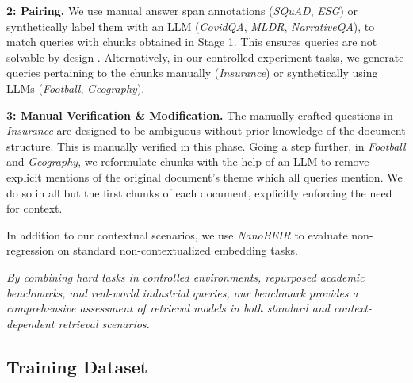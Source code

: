 \noindent\textbf{2: Pairing.} 
We use manual answer span annotations (\emph{SQuAD}, \emph{ESG}) or synthetically label them with an LLM (\emph{CovidQA}, \emph{MLDR}, \emph{NarrativeQA}), to match queries with chunks obtained in Stage 1. This ensures queries are not solvable by design . Alternatively, in our controlled experiment tasks, we generate queries pertaining to the chunks manually (\emph{Insurance}) or synthetically using LLMs (\emph{Football}, \emph{Geography}).


\noindent\textbf{3: Manual Verification \& Modification.}
The manually crafted questions in \emph{Insurance} are designed to be ambiguous without prior knowledge of the document structure. This is manually verified in this phase. Going a step further, in \emph{Football} and \emph{Geography}, we reformulate chunks with the help of an LLM to remove explicit mentions of the original document's theme which all queries mention. We do so in all but the first chunks of each document, explicitly enforcing the need for context.

In addition to our contextual scenarios, we use \emph{NanoBEIR}  to evaluate non-regression on standard non-contextualized embedding tasks.


\noindent\textit{By combining hard tasks in controlled environments, repurposed academic benchmarks, and real-world industrial queries, our benchmark provides a comprehensive assessment of retrieval models in both standard and context-dependent retrieval scenarios.}

\subsection{Training Dataset}

